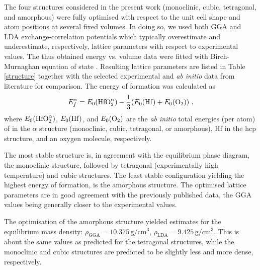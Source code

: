\documentclass[10pt,a4paper,twocolumn]{article}
\begin{document}
The four structures considered in the present work (monoclinic, cubic, tetragonal, and amorphous) were fully optimised with respect to the unit cell shape and atom positions at several fixed volumes.
In doing so, we used both GGA and LDA exchange-correlation potentials which typically overestimate and underestimate, respectively, lattice parameters with respect to experimental values.
The thus obtained energy vs. volume data were fitted with Birch-Murnaghan equation of state \cite{Birch1947}.
Resulting lattice parameters are listed in Table \ref{structure} together with the selected experimental and \textit{ab initio} data from literature for comparison.
The energy of formation was calculated as
\begin{equation}
  E_f^\alpha=E_0(\ce{HfO2}^\alpha) - \frac13 (E_0(\ce{Hf}) + E_0(\ce{O2}))\ ,
\end{equation}
where $E_0(\ce{HfO2}^\alpha)$, $E_0(\ce{Hf})$, and $E_0(\ce{O2})$ are the \textit{ab initio} total energies (per atom) of  in the $\alpha$ structure (monoclinic, cubic, tetragonal, or amorphous), Hf in the hcp structure, and an oxygen molecule, respectively.



The most stable structure is, in agreement with the equilibrium phase diagram, the monoclinic structure, followed by tetragonal (experimentally high temperature) and cubic structures.
The least stable configuration yielding the highest energy of formation, is the amorphous structure.
The optimised lattice parameters are in good agreement with the previously published data, the GGA values being generally closer to the experimental values.

The optimisation of the amorphous structure yielded estimates for the equilibrium mass density: $\rho_{\mathrm{GGA}}=10.375\,\mathrm{g/cm^3}$, $\rho_{\mathrm{LDA}}=9.425\,\mathrm{g/cm^3}$. %
This is about the same values as predicted for the tetragonal structures, while the monoclinic and cubic structures are predicted to be slightly less and more dense, respectively.
\end{document}

